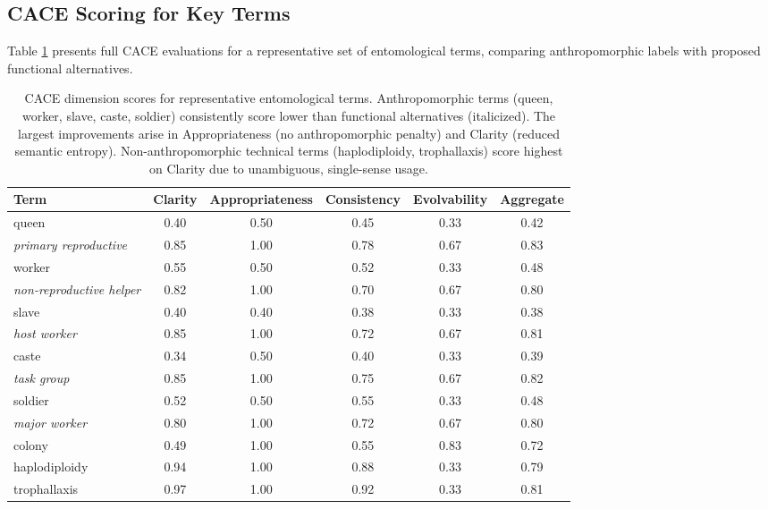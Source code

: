 \documentclass[
]{article}
\numberwithin{equation}{section}
\begin{document}
\subsection{CACE Scoring for Key
Terms}\label{cace-scoring-for-key-terms}

Table \ref{tab:cace_full} presents full CACE evaluations for a
representative set of entomological terms, comparing anthropomorphic
labels with proposed functional alternatives.

\begin{table}[h]
\centering
\small
\begin{tabular}{|l|c|c|c|c|c|}
\hline
\textbf{Term} & \textbf{Clarity} & \textbf{Appropriateness} & \textbf{Consistency} & \textbf{Evolvability} & \textbf{Aggregate} \\
\hline
queen & 0.40 & 0.50 & 0.45 & 0.33 & 0.42 \\
\textit{primary reproductive} & 0.85 & 1.00 & 0.78 & 0.67 & 0.83 \\
\hline
worker & 0.55 & 0.50 & 0.52 & 0.33 & 0.48 \\
\textit{non-reproductive helper} & 0.82 & 1.00 & 0.70 & 0.67 & 0.80 \\
\hline
slave & 0.40 & 0.40 & 0.38 & 0.33 & 0.38 \\
\textit{host worker} & 0.85 & 1.00 & 0.72 & 0.67 & 0.81 \\
\hline
caste & 0.34 & 0.50 & 0.40 & 0.33 & 0.39 \\
\textit{task group} & 0.85 & 1.00 & 0.75 & 0.67 & 0.82 \\
\hline
soldier & 0.52 & 0.50 & 0.55 & 0.33 & 0.48 \\
\textit{major worker} & 0.80 & 1.00 & 0.72 & 0.67 & 0.80 \\
\hline
colony & 0.49 & 1.00 & 0.55 & 0.83 & 0.72 \\
haplodiploidy & 0.94 & 1.00 & 0.88 & 0.33 & 0.79 \\
trophallaxis & 0.97 & 1.00 & 0.92 & 0.33 & 0.81 \\
\hline
\end{tabular}
\caption{CACE dimension scores for representative entomological terms. Anthropomorphic terms (queen, worker, slave, caste, soldier) consistently score lower than functional alternatives (italicized). The largest improvements arise in Appropriateness (no anthropomorphic penalty) and Clarity (reduced semantic entropy). Non-anthropomorphic technical terms (haplodiploidy, trophallaxis) score highest on Clarity due to unambiguous, single-sense usage.}
\label{tab:cace_full}
\end{table}
\end{document}
